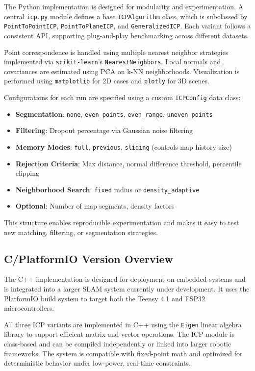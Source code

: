 \documentclass[11pt]{article}
\begin{document}
The Python implementation is designed for modularity and experimentation. A central \texttt{icp.py} module defines a base \texttt{ICPAlgorithm} class, which is subclassed by \texttt{PointToPointICP}, \texttt{PointToPlaneICP}, and \texttt{GeneralizedICP}. Each variant follows a consistent API, supporting plug-and-play benchmarking across different datasets.

Point correspondence is handled using multiple nearest neighbor strategies implemented via \texttt{scikit-learn}'s \texttt{NearestNeighbors}. Local normals and covariances are estimated using PCA on k-NN neighborhoods. Visualization is performed using \texttt{matplotlib} for 2D cases and \texttt{plotly} for 3D scenes.

Configurations for each run are specified using a custom \texttt{ICPConfig} data class:
\begin{itemize}
    \item \textbf{Segmentation}: \texttt{none}, \texttt{even\_points}, \texttt{even\_range}, \texttt{uneven\_points}
    \item \textbf{Filtering}: Dropout percentage via Gaussian noise filtering
    \item \textbf{Memory Modes}: \texttt{full}, \texttt{previous}, \texttt{sliding} (controls map history size)
    \item \textbf{Rejection Criteria}: Max distance, normal difference threshold, percentile clipping
    \item \textbf{Neighborhood Search}: \texttt{fixed} radius or \texttt{density\_adaptive}
    \item \textbf{Optional}: Number of map segments, density factors
\end{itemize}

This structure enables reproducible experimentation and makes it easy to test new matching, filtering, or segmentation strategies.

\subsection{C/PlatformIO Version Overview}

The C++ implementation is designed for deployment on embedded systems and is integrated into a larger SLAM system currently under development. It uses the PlatformIO build system to target both the Teensy 4.1 and ESP32 microcontrollers.

All three ICP variants are implemented in C++ using the \texttt{Eigen} linear algebra library to support efficient matrix and vector operations. The ICP module is class-based and can be compiled independently or linked into larger robotic frameworks. The system is compatible with fixed-point math and optimized for deterministic behavior under low-power, real-time constraints.
\end{document}
